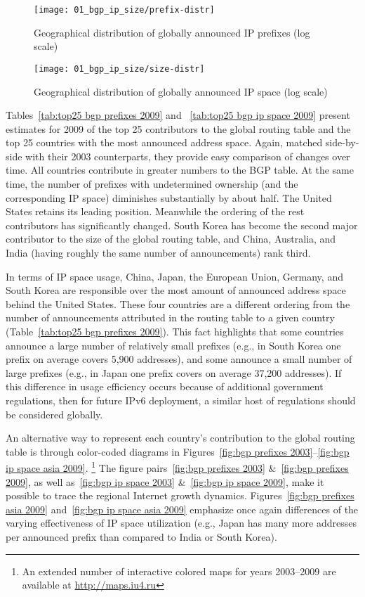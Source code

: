 \begin{figure}[htbp]
	\centering
		\texttt{[image: 01\_bgp\_ip\_size/prefix-distr]}
	\caption{Geographical distribution of globally announced IP prefixes (log scale)}
	\label{fig:prefix distr}
\end{figure}

\begin{figure}[htbp]
	\centering
		\texttt{[image: 01\_bgp\_ip\_size/size-distr]}
	\caption{Geographical distribution of globally announced IP space (log scale)}
	\label{fig:size distr}
\end{figure}

Tables~\ref{tab:top25 bgp prefixes 2009} and ~\ref{tab:top25 bgp ip space 2009}
present estimates for 2009 of the top 25 contributors to the global routing
table and the top 25 countries with the most announced address space. Again,
matched side-by-side with their 2003 counterparts, they provide easy comparison
of changes over time.  All countries contribute in greater numbers to the BGP
table. At the same time, the number of prefixes with undetermined ownership
(and the corresponding IP space) diminishes substantially by about half. The
United States retains its leading position. Meanwhile the ordering of the rest
contributors has significantly changed. South Korea has become the second major
contributor to the size of the global routing table, and China, Australia, and
India (having roughly the same number of announcements) rank third.

In terms of IP space usage, China, Japan, the European Union, Germany, and
South Korea are responsible over the most amount of announced address space
behind the United States. These four countries are a different ordering from
the number of announcements attributed in the routing table to a given country
(Table~\ref{tab:top25 bgp prefixes 2009}). This fact highlights that some
countries announce a large number of relatively small prefixes (e.g., in South
Korea one prefix on average covers 5,900 addresses), and some announce a small
number of large prefixes (e.g., in Japan one prefix covers on average 37,200
addresses). If this difference in usage efficiency occurs because of additional
government regulations, then for future IPv6 deployment, a similar host of
regulations should be considered globally.


An alternative way to represent each country's contribution to the global
routing table is through color-coded diagrams in Figures~\ref{fig:bgp prefixes
2003}--\ref{fig:bgp ip space asia 2009}.%
%
\footnote{%
An extended number of interactive colored maps for years 2003--2009 are
available at \url{http://maps.iu4.ru}}%
%
 The figure pairs~\ref{fig:bgp prefixes 2003} \&~\ref{fig:bgp prefixes 2009},
as well as~\ref{fig:bgp ip space 2003} \&~\ref{fig:bgp ip space 2009}, make it
possible to trace the regional Internet growth dynamics. Figures~\ref{fig:bgp
prefixes asia 2009} and~\ref{fig:bgp ip space asia 2009} emphasize once again
differences of the varying effectiveness of IP space utilization (e.g., Japan
has many more addresses per announced prefix than compared to India or South
Korea).



